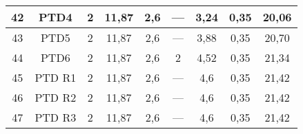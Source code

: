 \begin{table}[h!]
\begin{tabular}{|c|c|c|c|c|c|c|c|c|}
	42                 & PTD4               & 2                                                    & 11,87                                       & 2,6                                           & ---                                           & 3,24                                             & 0,35                                            & 20,06                                                             \\ \hline
	43                 & PTD5               & 2                                                    & 11,87                                       & 2,6                                           & ---                                           & 3,88                                             & 0,35                                            & 20,70                                                             \\ \hline
	44                 & PTD6               & 2                                                    & 11,87                                       & 2,6                                           & 2                                             & 4,52                                             & 0,35                                            & 21,34                                                             \\ \hline
	45                 & PTD R1             & 2                                                    & 11,87                                       & 2,6                                           & ---                                           & 4,6                                              & 0,35                                            & 21,42                                                             \\ \hline
	46                 & PTD R2             & 2                                                    & 11,87                                       & 2,6                                           & ---                                           & 4,6                                              & 0,35                                            & 21,42                                                             \\ \hline
	47                 & PTD R3             & 2                                                    & 11,87                                       & 2,6                                           & ---                                           & 4,6                                              & 0,35                                            & 21,42                                                             \\ \hline

\end{tabular}
\end{table}
